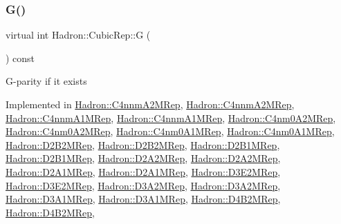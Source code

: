 \subsubsection{\texorpdfstring{G()}{G()}\hspace{0.1cm}{\footnotesize\ttfamily [1/2]}}
{\footnotesize\ttfamily virtual int Hadron\+::\+Cubic\+Rep\+::G (\begin{DoxyParamCaption}{ }\end{DoxyParamCaption}) const\hspace{0.3cm}{\ttfamily [pure virtual]}}

G-\/parity if it exists 

Implemented in \mbox{\hyperlink{structHadron_1_1C4nnmA2MRep_a4a41dd35707514a4f23fe162a37918b4}{Hadron\+::\+C4nnm\+A2\+M\+Rep}}, \mbox{\hyperlink{structHadron_1_1C4nnmA2MRep_a4a41dd35707514a4f23fe162a37918b4}{Hadron\+::\+C4nnm\+A2\+M\+Rep}}, \mbox{\hyperlink{structHadron_1_1C4nnmA1MRep_a80fdc5fe56a8c2c040f46f97a4bee86a}{Hadron\+::\+C4nnm\+A1\+M\+Rep}}, \mbox{\hyperlink{structHadron_1_1C4nnmA1MRep_a80fdc5fe56a8c2c040f46f97a4bee86a}{Hadron\+::\+C4nnm\+A1\+M\+Rep}}, \mbox{\hyperlink{structHadron_1_1C4nm0A2MRep_a36640a5b382aca709c5523a79cef513f}{Hadron\+::\+C4nm0\+A2\+M\+Rep}}, \mbox{\hyperlink{structHadron_1_1C4nm0A2MRep_a36640a5b382aca709c5523a79cef513f}{Hadron\+::\+C4nm0\+A2\+M\+Rep}}, \mbox{\hyperlink{structHadron_1_1C4nm0A1MRep_a4b8cedc0bf2a2c77a259d33915be1ab9}{Hadron\+::\+C4nm0\+A1\+M\+Rep}}, \mbox{\hyperlink{structHadron_1_1C4nm0A1MRep_a4b8cedc0bf2a2c77a259d33915be1ab9}{Hadron\+::\+C4nm0\+A1\+M\+Rep}}, \mbox{\hyperlink{structHadron_1_1D2B2MRep_a084bfd1709cfe35d65be35b8950cb32c}{Hadron\+::\+D2\+B2\+M\+Rep}}, \mbox{\hyperlink{structHadron_1_1D2B2MRep_a084bfd1709cfe35d65be35b8950cb32c}{Hadron\+::\+D2\+B2\+M\+Rep}}, \mbox{\hyperlink{structHadron_1_1D2B1MRep_abc6ac4ea31c661443bb658c8508bf378}{Hadron\+::\+D2\+B1\+M\+Rep}}, \mbox{\hyperlink{structHadron_1_1D2B1MRep_abc6ac4ea31c661443bb658c8508bf378}{Hadron\+::\+D2\+B1\+M\+Rep}}, \mbox{\hyperlink{structHadron_1_1D2A2MRep_a2596fa94fc03bbceebf051143cfb14ea}{Hadron\+::\+D2\+A2\+M\+Rep}}, \mbox{\hyperlink{structHadron_1_1D2A2MRep_a2596fa94fc03bbceebf051143cfb14ea}{Hadron\+::\+D2\+A2\+M\+Rep}}, \mbox{\hyperlink{structHadron_1_1D2A1MRep_a0778e49dc6d5a6cfa12f824a75b23b4b}{Hadron\+::\+D2\+A1\+M\+Rep}}, \mbox{\hyperlink{structHadron_1_1D2A1MRep_a0778e49dc6d5a6cfa12f824a75b23b4b}{Hadron\+::\+D2\+A1\+M\+Rep}}, \mbox{\hyperlink{structHadron_1_1D3E2MRep_a5df809ae715e45d60cef8bc3cfb4d567}{Hadron\+::\+D3\+E2\+M\+Rep}}, \mbox{\hyperlink{structHadron_1_1D3E2MRep_a5df809ae715e45d60cef8bc3cfb4d567}{Hadron\+::\+D3\+E2\+M\+Rep}}, \mbox{\hyperlink{structHadron_1_1D3A2MRep_aba5bc123585e4308b60da9a6a0077fea}{Hadron\+::\+D3\+A2\+M\+Rep}}, \mbox{\hyperlink{structHadron_1_1D3A2MRep_aba5bc123585e4308b60da9a6a0077fea}{Hadron\+::\+D3\+A2\+M\+Rep}}, \mbox{\hyperlink{structHadron_1_1D3A1MRep_aed0335625e2422a4694e6b30fdae9470}{Hadron\+::\+D3\+A1\+M\+Rep}}, \mbox{\hyperlink{structHadron_1_1D3A1MRep_aed0335625e2422a4694e6b30fdae9470}{Hadron\+::\+D3\+A1\+M\+Rep}}, \mbox{\hyperlink{structHadron_1_1D4B2MRep_a144db6312f6d067b35490405af2f5873}{Hadron\+::\+D4\+B2\+M\+Rep}}, \mbox{\hyperlink{structHadron_1_1D4B2MRep_a144db6312f6d067b35490405af2f5873}{Hadron\+::\+D4\+B2\+M\+Rep}}, 